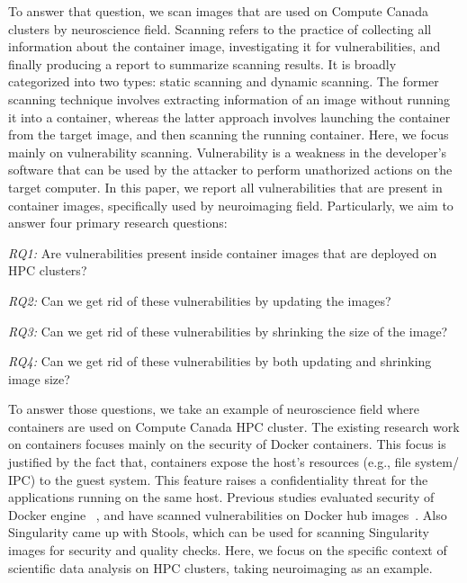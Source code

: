 \documentclass[a4paper,num-refs]{oup-contemporary}
\begin{document}
To answer that question, we scan images that are used on Compute
Canada clusters by neuroscience field. Scanning refers to the practice of
collecting all information about the container image, investigating it
for vulnerabilities, and finally producing a
report to summarize scanning results. It is broadly categorized into
two types: static scanning and dynamic scanning. The former scanning technique
involves extracting information of an image without running it into a container,
whereas the latter approach involves launching the container from the target image, and
then scanning the running container.
Here, we focus mainly on vulnerability scanning.
Vulnerability is a weakness in the developer's software that can be used
by the attacker to perform unathorized actions on the target computer.
In this paper, we report all vulnerabilities that are present in
container images, specifically used by neuroimaging field. Particularly,
we aim to answer four primary research questions:

\textit{RQ1:} Are vulnerabilities present inside container images that are
deployed on HPC clusters?

\textit{RQ2:} Can we get rid of these vulnerabilities by updating the
images?

\textit{RQ3:} Can we get rid of these vulnerabilities by shrinking the
size of the image?

\textit{RQ4:} Can we get rid of these vulnerabilities by both updating
and shrinking image size?

To answer those questions, we take an example of neuroscience field where
containers are used on Compute Canada HPC cluster.
The existing research work on containers focuses mainly on the security of Docker
containers.
This focus is justified by the fact that, containers expose the host's resources
(e.g., file system/ IPC) to the guest system. This feature raises a confidentiality
threat for the applications running on the same host. Previous studies evaluated
security of Docker engine ~\cite{martin2018docker, sultan2019container, combe2016docker, bui2015analysis},
and have scanned vulnerabilities on Docker hub images~\cite{Shu2017, gummaraju2015over}.
Also Singularity came up with Stools, which can be used for scanning Singularity images
for security and quality checks.
Here, we focus on the specific context of scientific data analysis on HPC clusters, taking
neuroimaging as an example.
\end{document}

